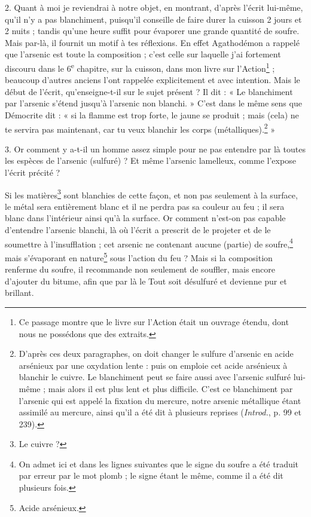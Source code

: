 \documentclass[a4paper, 11pt, oneside, polutonikogreek, french]{article}
\begin{document}
2. Quant à moi je reviendrai à notre objet, en montrant, d'après l'écrit lui-même, qu'il n'y a pas blanchiment, puisqu'il conseille de faire durer la cuisson 2 jours et 2 nuits ; tandis qu'une heure suffit pour évaporer une grande quantité de soufre. Mais par-là, il fournit un motif à tes réflexions. En effet Agathodémon a rappelé que l'arsenic est toute la composition ; c'est celle sur laquelle j'ai fortement discouru dans le 6\textsuperscript{e} chapitre, sur la cuisson, dans mon livre sur l'Action\footnote{Ce passage montre que le livre sur l'Action était un ouvrage étendu, dont nous ne possédons que des extraits.} ; beaucoup d'autres anciens l'ont rappelée explicitement et avec intention. Mais le début de l'écrit, qu'enseigne-t-il sur le sujet présent ? Il dit : « Le blanchiment par l'arsenic s'étend jusqu'à l'arsenic non blanchi. » C'est dans le même sens que Démocrite dit : « si la flamme est trop forte, le jaune se produit ; mais (cela) ne te servira pas maintenant, car tu veux blanchir les corps (métalliques).\footnote{D'après ces deux paragraphes, on doit changer le sulfure d'arsenic en acide arsénieux par une oxydation lente : puis on emploie cet acide arsénieux à blanchir le cuivre. Le blanchiment peut se faire aussi avec l'arsenic sulfuré lui-même ; mais alors il est plus lent et plus difficile. C'est ce blanchiment par l'arsenic qui est appelé la fixation du mercure, notre arsenic métallique étant assimilé au mercure, ainsi qu'il a été dit à plusieurs reprises (\emph{Introd.}, p. 99 et 239).} »

3. Or comment y a-t-il un homme assez simple pour ne pas entendre par là toutes les espèces de l'arsenic (sulfuré) ? Et même l'arsenic lamelleux, comme l'expose l'écrit précité ?

Si les matières\footnote{Le cuivre ?} sont blanchies de cette façon, et non pas seulement à la surface, le métal sera entièrement blanc et il ne perdra pas sa couleur au feu ; il sera blanc dans l'intérieur ainsi qu'à la surface. Or comment n'est-on pas capable d'entendre l'arsenic blanchi, là où l'écrit a prescrit de le projeter et de le soumettre à l'insufflation ; cet arsenic ne contenant aucune (partie) de soufre,\footnote{On admet ici et dans les lignes suivantes que le signe du soufre a été traduit par erreur par le mot plomb ; le signe étant le même, comme il a été dit plusieurs fois.} mais s'évaporant en nature\footnote{Acide arsénieux.} sous l'action du feu ? Mais si la composition renferme du soufre, il recommande non seulement de souffler, mais encore d'ajouter du bitume, afin que par là le Tout soit désulfuré et devienne pur et brillant.
\end{document}
